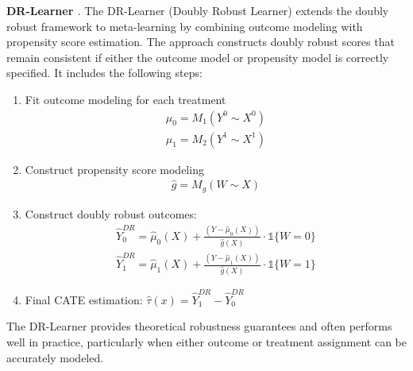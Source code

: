 \documentclass{article} %
\newcommand{\ind}{\mathds{1}}
\begin{document}
\textbf{DR-Learner \citep{kennedy2023towards}}. The DR-Learner (Doubly Robust Learner) extends the doubly robust framework to meta-learning by combining outcome modeling with propensity score estimation. The approach constructs doubly robust scores that remain consistent if either the outcome model or propensity model is correctly specified. It includes the following steps:
\begin{enumerate}[leftmargin=20pt, itemsep=0pt,parsep=0pt,partopsep=0pt,topsep=0pt]
    \item Fit outcome modeling for each treatment
        \begin{align*}
            \hat{\mu}_0 = M_1(Y^0 \sim X^0)\\
            \hat{\mu}_1 = M_2(Y^1 \sim X^1)
        \end{align*}
    \item Construct propensity score modeling
        \begin{align*}
            \hat{g} = M_g(W \sim X)
        \end{align*}
    \item Construct doubly robust outcomes:
        \begin{align*}
            \hat{Y}_{0}^{DR} = \hat{\mu}_0(X) + \frac{(Y - \hat{\mu}_0(X))}{\hat{g}(X)}  \cdot \ind\{W = 0\} \\
            \hat{Y}_{1}^{DR} = \hat{\mu}_1(X) + \frac{(Y - \hat{\mu}_1(X))}{\hat{g}(X)}  \cdot \ind\{W = 1\}
        \end{align*}
    \item Final CATE estimation: $\hat{\tau}(x) = \hat{Y}_{1}^{DR} - \hat{Y}_{0}^{DR}$
\end{enumerate}
The DR-Learner provides theoretical robustness guarantees and often performs well in practice, particularly when either outcome or treatment assignment can be accurately modeled.
\end{document}
